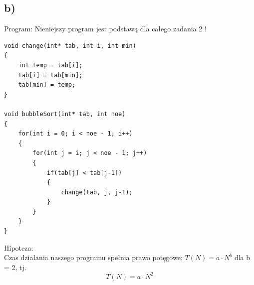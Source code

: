 \documentclass{article}
\begin{document}
\subsection{b)}
Program:
Nieniejszy program jest podstawą dla całego zadania 2 !
\begin{lstlisting}
void change(int* tab, int i, int min)
{
    int temp = tab[i];
    tab[i] = tab[min];
    tab[min] = temp;
}

void bubbleSort(int* tab, int noe)
{
    for(int i = 0; i < noe - 1; i++)
    {
        for(int j = i; j < noe - 1; j++)
        {
            if(tab[j] < tab[j-1])
            {
                change(tab, j, j-1);
            }
        }
    }
}
\end{lstlisting}
Hipoteza:\\
Czas działania naszego programu spełnia prawo potęgowe: $T(N) = a \cdot N^b$ dla b = 2, tj. $$T(N) = a \cdot N^2$$
\end{document}
